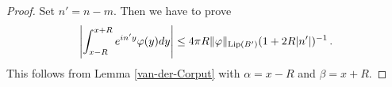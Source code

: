 {\begin{lemma}
\end{lemma}
\begin{proof}
Set $n'=n-m$. Then we have to prove
\begin{equation}
    \label{eq-vdc-cond2}
    \left|\int_{x-R}^{x+R} e^{in'y}\varphi(y) dy\right|\le 4\pi  R\|\varphi\|_{\operatorname{\operatorname{Lip}}(B')}
(1+2R|n'|)^{-1}\, .
\end{equation}
This follows from Lemma \ref{van-der-Corput} with $\alpha = x - R$ and $\beta = x + R$.
%

\end{proof}}
